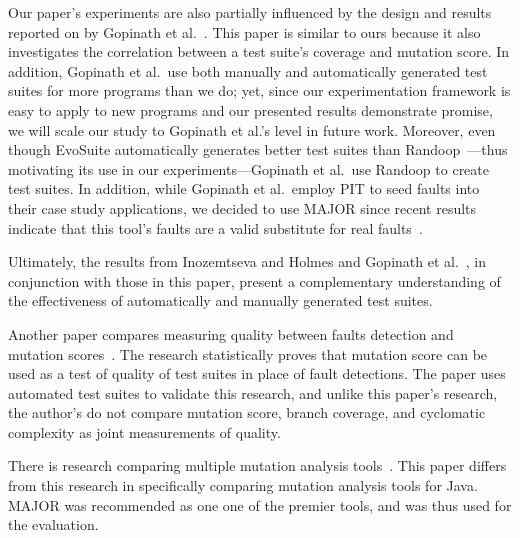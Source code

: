 Our paper's experiments are also partially influenced by the design and results reported on by Gopinath et
al.~\cite{gopinath2014}.  This paper is similar to ours because it also investigates the correlation between a test
suite's coverage and mutation score.  In addition, Gopinath et al.\ use both manually and automatically generated test
suites for more programs than we do; yet, since our experimentation framework is easy to apply to new programs and our
presented results demonstrate promise, we will scale our study to Gopinath et al.'s level in future work. Moreover, even
though EvoSuite automatically generates better test suites than Randoop~\cite{fraser2013a}---thus motivating its use in
our experiments---Gopinath et al.\ use Randoop to create test suites.  In addition, while Gopinath et al.\ employ PIT to
seed faults into their case study applications, we decided to use MAJOR since recent results indicate that this tool's
faults are a valid substitute for real faults~\cite{just2014}. 

Ultimately, the results from Inozemtseva and Holmes \cite{inozemtseva2014} and Gopinath et al.~\cite{gopinath2014}, in
conjunction with those in this paper, present a complementary understanding of the effectiveness of automatically and
manually generated test suites.


Another paper compares measuring quality between faults detection and mutation scores~\cite{just2014}. The research statistically proves that mutation score can be used as a test of quality of test suites in place of fault detections.  The paper uses automated test suites to validate this research, and unlike this paper's research, the author's do not compare mutation score, branch coverage, and cyclomatic complexity as joint measurements of quality. 

There is research comparing multiple mutation analysis tools~\cite{ComparingAutomatedMutationTools:2013}. This paper differs from this research in specifically comparing mutation analysis tools for Java. MAJOR was recommended as one one of the premier tools, and was thus used for the evaluation.
